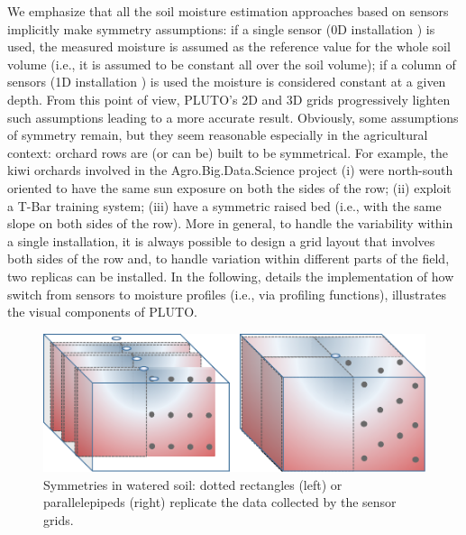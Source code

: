 We emphasize that all the soil moisture estimation approaches based on sensors implicitly make symmetry assumptions: if a single sensor (0D installation \cite{arif2013estimation}) is used, the measured moisture is assumed as the reference value for the whole soil volume (i.e., it is assumed to be constant all over the soil volume); if a column of sensors (1D installation \cite{Karandish2016892, Goldstein2018421, Jimenez20201327, Pan2021, Li20152382}) is used the moisture is considered constant at a given depth. From this point of view, PLUTO's 2D and 3D grids progressively lighten such assumptions leading to a more accurate result. Obviously, some assumptions of symmetry remain, but they seem reasonable especially in the agricultural context: orchard rows are (or can be) built to be symmetrical. For example, the kiwi orchards involved in the Agro.Big.Data.Science project (i) were north-south oriented to have the same sun exposure on both the sides of the row; (ii) exploit a T-Bar training system; (iii) have a symmetric raised bed (i.e., with the same slope on both sides of the row).
More in general, to handle the variability within a single installation, it is always possible to design a grid layout that involves both sides of the row and, to handle variation within different parts of the field, two replicas can be installed.
In the following,  details the implementation of how switch from sensors to moisture profiles (i.e., via profiling functions),  illustrates the visual components of PLUTO.

\begin{figure}[t]
\centering
\includegraphics[scale=.6]{chapters/physics-aware/pluto/img/SensorGrid3.pdf}
\caption{Symmetries in watered soil: dotted rectangles (left) or parallelepipeds (right) replicate the data collected by the sensor grids.}
\label{pluto-fig:symm}
\end{figure}

